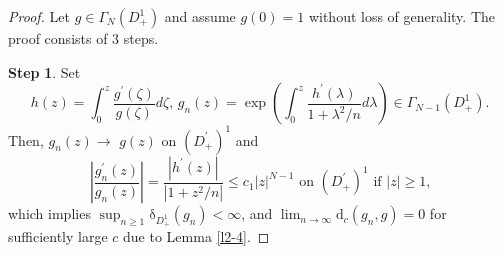 \documentclass[10pt,a4paper]{amsart}
\begin{document}
\begin{proof}
Let $g\in\Gamma_{N}\left(  D_{+}^{1}\right)  $ and assume $g(0)=1$ without
loss of generality. The proof consists of 3 steps.

\textbf{Step} \textbf{1}. Set%
\[
h\left(  z\right)  =%
{\displaystyle\int_{0}^{z}}
\dfrac{g^{\prime}\left(  \zeta\right)  }{g\left(  \zeta\right)  }d\zeta\text{,
\ }g_{n}\left(  z\right)  =\exp\left(  \int_{0}^{z}\dfrac{h^{\prime}\left(
\lambda\right)  }{1+\lambda^{2}/n}d\lambda\right)  \in\Gamma_{N-1}\left(
D_{+}^{1}\right)  \text{.}%
\]
Then, $g_{n}\left(  z\right)  \rightarrow$ $g\left(  z\right)  $ on $\left(
D_{+}^{\prime}\right)  ^{1}$ and%
\[
\left\vert \dfrac{g_{n}^{\prime}\left(  z\right)  }{g_{n}\left(  z\right)
}\right\vert =\dfrac{\left\vert h^{\prime}\left(  z\right)  \right\vert
}{\left\vert 1+z^{2}/n\right\vert }\leq c_{1}\left\vert z\right\vert
^{N-1}\text{ \ on }\left(  D_{+}^{\prime}\right)  ^{1}\text{ if }\left\vert
z\right\vert \geq1\text{,}%
\]
which implies $\sup_{n\geq1}\mathrm{\delta}_{D_{+}^{1}}\left(  g_{n}\right)
<\infty$, and $\lim_{n\rightarrow\infty}\mathrm{d}_{c}\left(  g_{n},g\right)
=0$ for sufficiently large $c$ due to Lemma \ref{l2-4}.


\end{proof}
\end{document}
